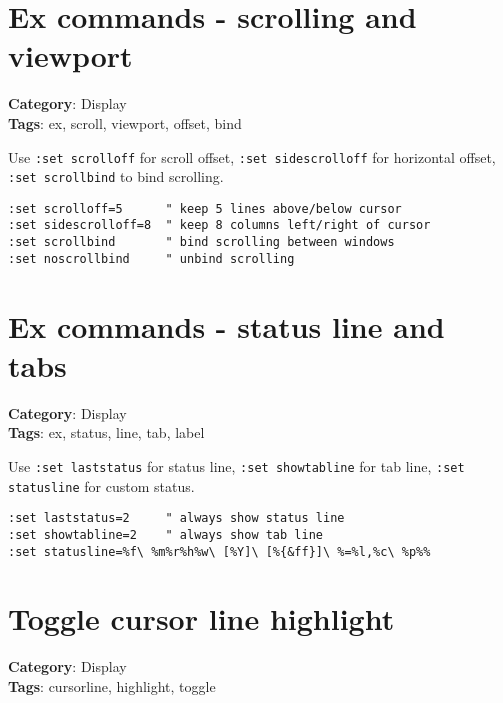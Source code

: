 {{{{\section{Ex commands - scrolling and viewport}

\textbf{Category}: Display\\ \textbf{Tags}: ex, scroll, viewport, offset, bind
\vspace{0.5cm}

Use {\footnotesize \Verb§:set scrolloff§} for scroll offset, {\footnotesize \Verb§:set sidescrolloff§} for horizontal offset, {\footnotesize \Verb§:set scrollbind§} to bind scrolling.

\begin{Exa*}{}
\begin{Verbatim}[fontsize=\footnotesize, breaklines, breakanywhere]
:set scrolloff=5      " keep 5 lines above/below cursor
:set sidescrolloff=8  " keep 8 columns left/right of cursor
:set scrollbind       " bind scrolling between windows
:set noscrollbind     " unbind scrolling
\end{Verbatim}
\end{Exa*}

\section{Ex commands - status line and tabs}

\textbf{Category}: Display\\ \textbf{Tags}: ex, status, line, tab, label
\vspace{0.5cm}

Use {\footnotesize \Verb§:set laststatus§} for status line, {\footnotesize \Verb§:set showtabline§} for tab line, {\footnotesize \Verb§:set statusline§} for custom status.

\begin{Exa*}{}
\begin{Verbatim}[fontsize=\footnotesize, breaklines, breakanywhere]
:set laststatus=2     " always show status line
:set showtabline=2    " always show tab line
:set statusline=%f\ %m%r%h%w\ [%Y]\ [%{&ff}]\ %=%l,%c\ %p%%
\end{Verbatim}
\end{Exa*}

\section{Toggle cursor line highlight}

\textbf{Category}: Display\\ \textbf{Tags}: cursorline, highlight, toggle
\vspace{0.5cm}

}}}}

